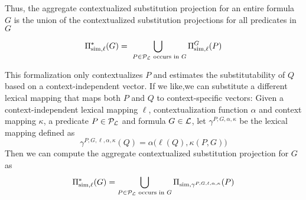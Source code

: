 Thus, the aggregate contextualized substitution projection for an entire formula
$G$ is the union of the contextualized substitution projections for all
predicates in $G$

\[\Pi^*_{\mathrm{sim}, \ell}(G) = \bigcup_{~P \in {\cal{P}}_{{\cal{L}}} \text{ occurs in }
G} \Pi^G_{\mathrm{sim}, \ell}(P) \] 


This formalization only contextualizes $P$ and estimates the substitutability of
$Q$ based on a context-independent vector. If we like,we can substitute a
different lexical mapping that maps both $P$ and $Q$ to context-specific
vectors: Given a context-independent lexical mapping $\ell$, contextualization
function $\alpha$ and context mapping $\kappa$, a predicate $P \in
{\cal{P}}_{{\cal{L}}}$ and formula $G \in {\cal{L}}$, let $\gamma^{P, G, \alpha,
\kappa}$ be the lexical mapping defined as \[\gamma^{P, G, \ell, \alpha,
\kappa}(Q) = \alpha\big(\ell(Q), \kappa(P, G)\big) \] Then we can compute the
aggregate contextualized substitution projection for $G$ as \[\Pi^*_{\mathrm{sim}, \ell}(G)
= \bigcup_{P \in {\cal{P}}_{{\cal{L}}} \text{ occurs in } G} \Pi_{\mathrm{sim}, \gamma^{P, G, \ell, \alpha,
\kappa}}(P) \]

